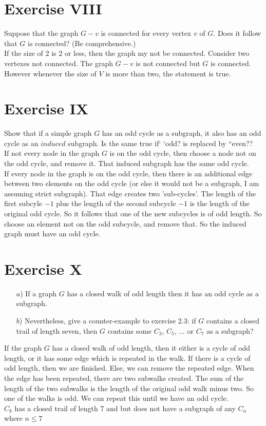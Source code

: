 \documentclass[fontsize=11pt]{scrartcl} %
\numberwithin{equation}{section} %
\numberwithin{figure}{section} %
\numberwithin{table}{section} %
\begin{document}
\section*{Exercise VIII}
	Suppose that the graph $G-v$ is connected for every vertex $v$ of $G$.
	Does it follow that $G$ is connected? (Be comprehensive.)\\

If the size of $2$ is 2 or less, then the graph my not be connected.  Consider two vertexes not connected.  The graph $G-v$ is not connected but $G$ is connected.  However whenever the size of $V$ is more than two, the statement is true.  

\section*{Exercise IX}
 Show that if a simple graph $G$ has an odd cycle as a subgraph, it also
	has an odd cycle as an $induced$ subgraph. Is the same true if` `odd? is
	replaced by ``even??\\
	
	If not every node in the graph $G$ is on the odd cycle, then choose a node not on the odd cycle, and remove it.  That induced subgraph has the same odd cycle.  \\
	
	If every node in the graph is on the odd cycle, then there is an additional edge between two elements on the odd cycle (or else it would not be a subgraph, I am assuming strict subgraph).  That edge creates two 'sub-cycles'.  The length of the first subcyle $-1$ plus the length of the second subcycle $-1$ is the length of the original odd cycle.  So it follows that one of the new subcycles is of odd length.  So choose an element not on the odd subcycle, and remove that.  So the induced graph must have an odd cycle.  

\section*{Exercise X}
\begin{itemize}
		\item[$a$)] 
		If a graph $G$ has a closed walk of odd length then it has
			an odd cycle as a subgraph.
		
		\item[$b$)] Nevertheless, give a counter-example to exercise 2.3: if $G$ contains a closed trail of length seven, then $G$ contains some $C_3$, $C_5$, ... or $C_7$ as a subgraph?
	\end{itemize}
	
	If the graph $G$ has a closed walk of odd length, then it either is a cycle of odd length, or it has some edge which is repeated in the walk.  If there is a cycle of odd length, then we are finished.  Else, we can remove the repeated edge.  When the edge has been repeated, there are two subwalks created.  The sum of the length of the two subwalks is the length of the original odd walk minus two.  So one of the walks is odd. We can repeat this until we have an odd cycle.  \\
	
	$C_8$ has a closed trail of length 7 and but does not have a subgraph of any $C_n$ where $n \leq 7$  
\end{document}

